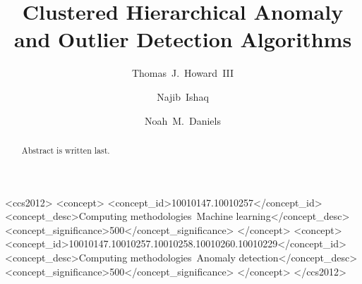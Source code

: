 \documentclass[sigconf]{acmart}
\begin{document}
\title{Clustered Hierarchical Anomaly and Outlier Detection Algorithms}

\author{Thomas~J.~Howard~III}

\author{Najib~Ishaq}
\authornotemark[1]

\author{Noah~M.~Daniels}

\renewcommand{\shortauthors}{Howard and Ishaq, et al.}

\begin{abstract}
Abstract is written last.
\end{abstract}

\begin{CCSXML}
<ccs2012>
   <concept>
       <concept_id>10010147.10010257</concept_id>
       <concept_desc>Computing methodologies~Machine learning</concept_desc>
       <concept_significance>500</concept_significance>
       </concept>
   <concept>
       <concept_id>10010147.10010257.10010258.10010260.10010229</concept_id>
       <concept_desc>Computing methodologies~Anomaly detection</concept_desc>
       <concept_significance>500</concept_significance>
       </concept>
 </ccs2012>
\end{CCSXML}



\maketitle









\end{document}
